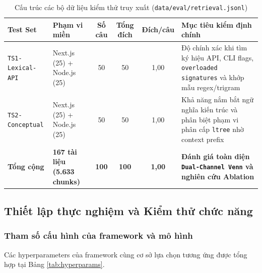 \begin{table}[H]
\centering
\caption{Cấu trúc các bộ dữ liệu kiểm thử truy xuất (\texttt{data/eval/retrieval.jsonl})}
\label{tab:test_sets}
\small\setlength{\tabcolsep}{4.5pt}\begin{tabularx}{\textwidth}{llccc>{\raggedright\arraybackslash}X}
\toprule
\textbf{Test Set} & \textbf{Phạm vi miền} & \textbf{Số câu} & \textbf{Tổng đích} & \textbf{Đích/câu} & \textbf{Mục tiêu kiểm định chính} \\
\midrule
\texttt{TS1-Lexical-API} & Next.js (25) + Node.js (25) & 50 & 50 & 1,00 & Độ chính xác khi tìm ký hiệu API, CLI flags, \texttt{overloaded signatures} và khớp mẫu regex/trigram \\
\addlinespace[2pt]
\texttt{TS2-Conceptual} & Next.js (25) + Node.js (25) & 50 & 50 & 1,00 & Khả năng nắm bắt ngữ nghĩa kiến trúc và phân biệt phạm vi phân cấp \texttt{ltree} nhờ context prefix \\
\midrule
\textbf{Tổng cộng} & \textbf{167 tài liệu (5.633 chunks)} & \textbf{100} & \textbf{100} & \textbf{1,00} & \textbf{Đánh giá toàn diện \texttt{Dual-Channel Venn} và nghiên cứu Ablation} \\
\bottomrule
\end{tabularx}
\end{table}

\subsection{Thiết lập thực nghiệm và Kiểm thử chức năng}

\subsubsection{Tham số cấu hình của framework và mô hình}
Các hyperparameters của framework cùng cơ sở lựa chọn tương ứng được tổng hợp tại Bảng \ref{tab:hyperparams}.

